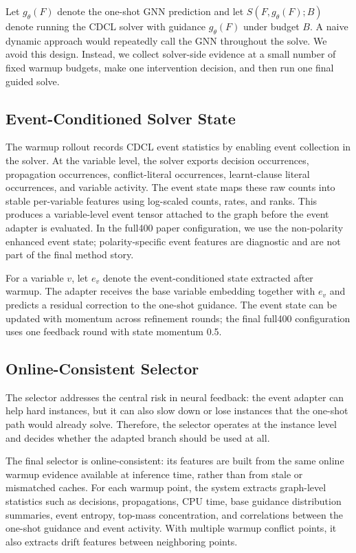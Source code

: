 \documentclass[11pt]{article}
\begin{document}
Let $g_\theta(F)$ denote the one-shot GNN prediction and let $S(F, g_\theta(F); B)$ denote running the CDCL solver with guidance $g_\theta(F)$ under budget $B$. A naive dynamic approach would repeatedly call the GNN throughout the solve. We avoid this design. Instead, we collect solver-side evidence at a small number of fixed warmup budgets, make one intervention decision, and then run one final guided solve.

\subsection{Event-Conditioned Solver State}

The warmup rollout records CDCL event statistics by enabling event collection in the solver. At the variable level, the solver exports decision occurrences, propagation occurrences, conflict-literal occurrences, learnt-clause literal occurrences, and variable activity. The event state maps these raw counts into stable per-variable features using log-scaled counts, rates, and ranks. This produces a variable-level event tensor attached to the graph before the event adapter is evaluated. In the full400 paper configuration, we use the non-polarity enhanced event state; polarity-specific event features are diagnostic and are not part of the final method story.

For a variable $v$, let $e_v$ denote the event-conditioned state extracted after warmup. The adapter receives the base variable embedding together with $e_v$ and predicts a residual correction to the one-shot guidance. The event state can be updated with momentum across refinement rounds; the final full400 configuration uses one feedback round with state momentum 0.5.

\subsection{Online-Consistent Selector}

The selector addresses the central risk in neural feedback: the event adapter can help hard instances, but it can also slow down or lose instances that the one-shot path would already solve. Therefore, the selector operates at the instance level and decides whether the adapted branch should be used at all.

The final selector is online-consistent: its features are built from the same online warmup evidence available at inference time, rather than from stale or mismatched caches. For each warmup point, the system extracts graph-level statistics such as decisions, propagations, CPU time, base guidance distribution summaries, event entropy, top-mass concentration, and correlations between the one-shot guidance and event activity. With multiple warmup conflict points, it also extracts drift features between neighboring points.
\end{document}
